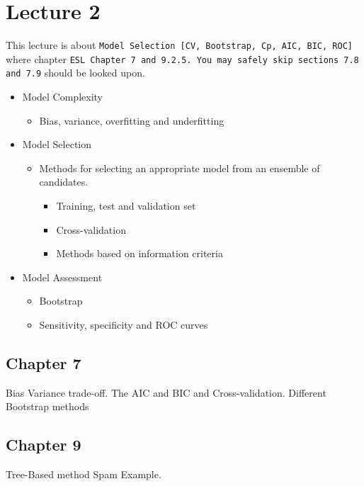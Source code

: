 \chapter{Lecture 2}

This lecture is about \texttt{Model Selection [CV, Bootstrap, Cp, AIC, BIC, ROC]} where chapter
\texttt{ESL Chapter 7 and 9.2.5. You may safely skip sections 7.8 and 7.9} should be looked upon.

\begin{itemize}
  \item Model Complexity
  \begin{itemize}
    \item Bias, variance, overfitting and underfitting
  \end{itemize}
  \item Model Selection
  \begin{itemize}
    \item Methods for selecting an appropriate model from an ensemble of candidates.
        \begin{itemize}
          \item Training, test and validation set
          \item Cross-validation
          \item Methods based on information criteria
        \end{itemize}
  \end{itemize}
  \item Model Assessment
  \begin{itemize}
    \item Bootstrap
    \item Sensitivity, specificity and ROC curves
  \end{itemize}
\end{itemize}





\section{Chapter 7}

Bias Variance trade-off. The AIC and BIC and Cross-validation. Different Bootstrap methods

\section{Chapter 9}

Tree-Based method Spam Example.

